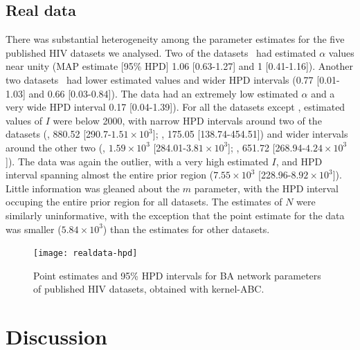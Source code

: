 \documentclass[12pt]{article}\usepackage[]{graphicx}\usepackage[]{color}
\begin{document}
\subsection*{Real data}



There was substantial heterogeneity among the parameter estimates for the five
published HIV datasets we analysed. Two of the
datasets~\autocite{niculescu2015recent, wang2015targeting} had estimated
$\alpha$ values near unity (\gls{MAP} estimate [95\% \gls{HPD}] 
  1.06 
  [0.63-1.27]
and
  1 
  [0.41-1.16]). Another two
datasets~\autocite{li2015hiv, cuevas2009hiv} had lower estimated values and wider
\gls{HPD} intervals
  (0.77 
  [0.01-1.03]
and
  0.66 
  [0.03-0.84]). 
The \textcite{novitsky2014impact} data had an extremely low estimated $\alpha$
and a very wide \gls{HPD} interval
  0.17 
  [0.04-1.39]). 
For all the datasets except \textcite{novitsky2014impact}, estimated values of
$I$ were below 2000, with narrow \gls{HPD} intervals around two of the
datasets
  (\textcite{cuevas2009hiv}, 880.52 
  [290.7-\ensuremath{1.51\times 10^{3}}];
   \textcite{niculescu2015recent}, 175.05
  [138.74-454.51])
and wider intervals around the other two
  (\textcite{li2015hiv}, \ensuremath{1.59\times 10^{3}} 
  [284.01-\ensuremath{3.81\times 10^{3}}];
   \textcite{wang2015targeting}, 651.72
  [268.94-\ensuremath{4.24\times 10^{3}}]).
The \textcite{novitsky2014impact} data was again the outlier, with a very high
estimated $I$, and \gls{HPD} interval spanning almost the entire prior region
  (\ensuremath{7.55\times 10^{3}} 
  [228.96-\ensuremath{8.92\times 10^{3}}]).
Little information was gleaned about the $m$ parameter, with the \gls{HPD}
interval occuping the entire prior region for all datasets. The estimates of
$N$ were similarly uninformative, with the exception that the point estimate
for the \textcite{wang2015targeting} data was smaller
  (\ensuremath{5.84\times 10^{3}})
than the estimates for other datasets.

\begin{figure}[ht]
  \centering
  \texttt{[image: realdata-hpd]}
  \caption{
    Point estimates and 95\% \gls{HPD} intervals for \gls{BA} network
    parameters of published HIV datasets, obtained with kernel-ABC.
  }
\end{figure}

\section*{Discussion}
\end{document}
